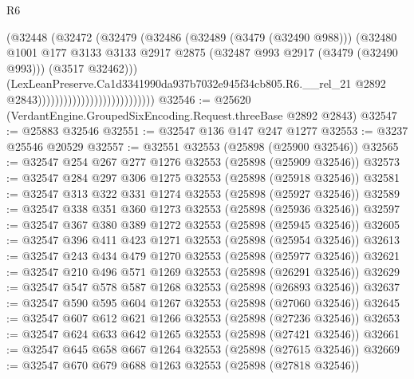 \begin{lexlean}{R6}
\begin{coremodule}
                                                  (@32448
                                                    (@32472
                                                      (@32479
                                                        (@32486
                                                          (@32489 (@3479 (@32490 @988)))
                                                          (@32480
                                                            @1001
                                                            @177
                                                            @3133
                                                            @3133
                                                            @2917
                                                            @2875
                                                            (@32487
                                                              @993
                                                              @2917
                                                              (@3479 (@32490 @993)))
                                                            (@3517 @32462)))
                                                        (LexLeanPreserve.Ca1d3341990da937b7032e945f34cb805.R6.__rel_21
                                                          @2892
                                                          @2843)))))))))))))))))))))))))))
@32546 := @25620 (VerdantEngine.GroupedSixEncoding.Request.threeBase @2892 @2843)
@32547 := @25883 @32546
@32551 := @32547 @136 @147 @247 @1277
@32553 := @3237 @25546 @20529
@32557 := @32551 @32553 (@25898 (@25900 @32546))
@32565 := @32547 @254 @267 @277 @1276 @32553 (@25898 (@25909 @32546))
@32573 := @32547 @284 @297 @306 @1275 @32553 (@25898 (@25918 @32546))
@32581 := @32547 @313 @322 @331 @1274 @32553 (@25898 (@25927 @32546))
@32589 := @32547 @338 @351 @360 @1273 @32553 (@25898 (@25936 @32546))
@32597 := @32547 @367 @380 @389 @1272 @32553 (@25898 (@25945 @32546))
@32605 := @32547 @396 @411 @423 @1271 @32553 (@25898 (@25954 @32546))
@32613 := @32547 @243 @434 @479 @1270 @32553 (@25898 (@25977 @32546))
@32621 := @32547 @210 @496 @571 @1269 @32553 (@25898 (@26291 @32546))
@32629 := @32547 @547 @578 @587 @1268 @32553 (@25898 (@26893 @32546))
@32637 := @32547 @590 @595 @604 @1267 @32553 (@25898 (@27060 @32546))
@32645 := @32547 @607 @612 @621 @1266 @32553 (@25898 (@27236 @32546))
@32653 := @32547 @624 @633 @642 @1265 @32553 (@25898 (@27421 @32546))
@32661 := @32547 @645 @658 @667 @1264 @32553 (@25898 (@27615 @32546))
@32669 := @32547 @670 @679 @688 @1263 @32553 (@25898 (@27818 @32546))

\end{coremodule}
\end{lexlean}
